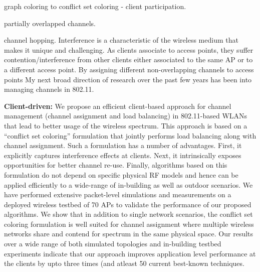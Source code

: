 \documentclass[10pt,letterpaper]{article}
\begin{document}
graph coloring to conflict set coloring - client participation.

partially overlapped channels.

channel hopping.
Interference is a characteristic of the wireless medium that makes it unique and challenging. As clients associate
to access points, they suffer contention/interference from other clients either associated to the same AP  
or to a different access point. By assigning different non-overlapping channels to access points
 My next broad direction
of research over the past few years has been into managing channels in 802.11. 

{\bf Client-driven:}
We propose an efficient client-based approach for
channel management (channel assignment and load balancing)
in 802.11-based WLANs that lead to better usage of the wireless
spectrum. This approach is based on a “conflict set coloring” formulation
that jointly performs load balancing along with channel
assignment. Such a formulation has a number of advantages.
First, it explicitly captures interference effects at clients. Next,
it intrinsically exposes opportunities for better channel re-use.
Finally, algorithms based on this formulation do not depend on
specific physical RF models and hence can be applied efficiently
to a wide-range of in-building as well as outdoor scenarios.
We have performed extensive packet-level simulations and
measurements on a deployed wireless testbed of 70 APs to
validate the performance of our proposed algorithms. We show
that in addition to single network scenarios, the conflict set
coloring formulation is well suited for channel assignment where
multiple wireless networks share and contend for spectrum in
the same physical space. Our results over a wide range of both
simulated topologies and in-building testbed experiments indicate
that our approach improves application level performance at the
clients by upto three times (and atleast 50%
current best-known techniques.
\end{document}
